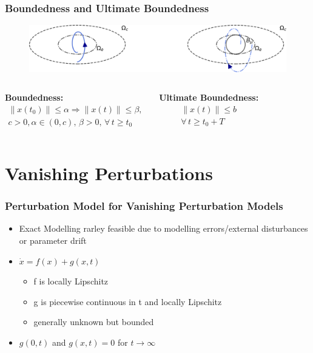 \documentclass[student, noshadow, lsr, english, aspectratio=169, t]{ITR_LSR_slides}
\begin{document}
\begin{frame}
	\frametitle{Boundedness and Ultimate Boundedness}
	\begin{figure}
		\centering
		\includegraphics[width=\textwidth]{ultimate_boundedness_rotated.pdf}
		\caption{}
		\label{fig:boundedness_vs_ultimate_boundedness}
	\end{figure}
	\vspace{-1cm}
	\begin{columns}[t,totalwidth=\textwidth]
		\textbf{Boundedness:}
		\begin{align*}
			\|x(t_0)\| \leq \alpha \Rightarrow \|x(t)\| \leq \beta,
			\\ c>0, \alpha\in(0,c),\, \beta>0,\,\forall\, t \geq t_0
		\end{align*}

		\textbf{Ultimate Boundedness:}
		\begin{align*}
			\|x(t)\| \leq b 
			\\ \forall\, t \geq t_0+T
		\end{align*}
    \end{columns}
\end{frame}

\section{Vanishing Perturbations}
\begin{frame}
	\frametitle{Perturbation Model for Vanishing Perturbation Models}
	\begin{itemize}
		\item Exact Modelling rarley feasible due to modelling errors/external disturbances or parameter drift
		\item $\dot{x}=f(x)+g(x,t)$
		\begin{itemize}
			\item f is locally Lipschitz
			\item g is piecewise continuous in t and locally Lipschitz
			\item generally unknown but bounded
		\end{itemize}
		\item $g(0,t)$ and $g(x,t)=0$ for $t\rightarrow\infty$
	\end{itemize}
\end{frame}
\end{document}
